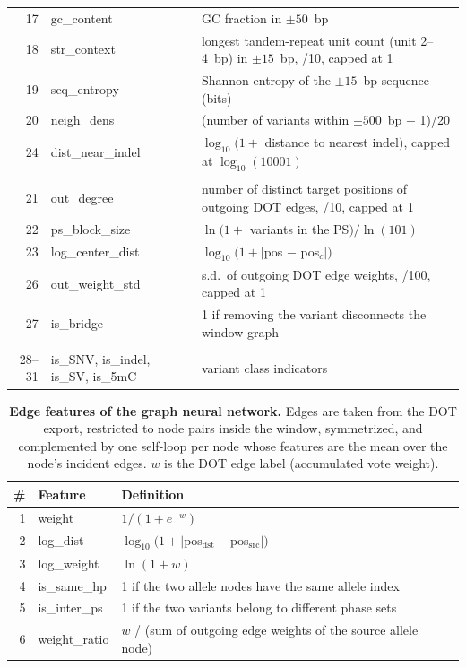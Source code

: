 \documentclass[11pt,a4paper]{article}
\begin{document}
\begin{table}[h]
\begin{tabular}{@{}r L{3.3cm} L{9.6cm}@{}}
17 & gc\_content & GC fraction in $\pm 50$~bp \\
18 & str\_context & longest tandem-repeat unit count (unit 2--4~bp) in $\pm 15$~bp, /10, capped at 1 \\
19 & seq\_entropy & Shannon entropy of the $\pm 15$~bp sequence (bits) \\
20 & neigh\_dens & (number of variants within $\pm 500$~bp $-$ 1)/20 \\
24 & dist\_near\_indel & $\log_{10}(1 + $ distance to nearest indel$)$, capped at $\log_{10}(10001)$ \\
\addlinespace
{}\\
21 & out\_degree & number of distinct target positions of outgoing DOT edges, /10, capped at 1 \\
22 & ps\_block\_size & $\ln(1 + $ variants in the PS$) / \ln(101)$ \\
23 & log\_center\_dist & $\log_{10}(1 + |$pos $-$ pos$_c|)$ \\
26 & out\_weight\_std & s.d.\ of outgoing DOT edge weights, /100, capped at 1 \\
27 & is\_bridge & 1 if removing the variant disconnects the window graph \\
\addlinespace
{}\\
28--31 & is\_SNV, is\_indel, is\_SV, is\_5mC & variant class indicators \\
\bottomrule
\end{tabular}
\end{table}
\FloatBarrier

\begin{table}[h]
\caption{\textbf{Edge features of the graph neural network.} Edges are taken from the DOT export, restricted to node pairs inside the window, symmetrized, and complemented by one self-loop per node whose features are the mean over the node's incident edges. $w$ is the DOT edge label (accumulated vote weight).}
\label{tab:edgefeat}
\small
\begin{tabular}{@{}r L{3.3cm} L{9.6cm}@{}}
\toprule
\# & Feature & Definition \\
 & weight & $1/(1 + e^{-w})$ \\
2 & log\_dist & $\log_{10}(1 + |$pos$_{\mathrm{dst}} - $pos$_{\mathrm{src}}|)$ \\
3 & log\_weight & $\ln(1 + w)$ \\
4 & is\_same\_hp & 1 if the two allele nodes have the same allele index \\
5 & is\_inter\_ps & 1 if the two variants belong to different phase sets \\
6 & weight\_ratio & $w$ / (sum of outgoing edge weights of the source allele node) \\
\bottomrule
\end{tabular}
\end{table}
\FloatBarrier
\end{document}
